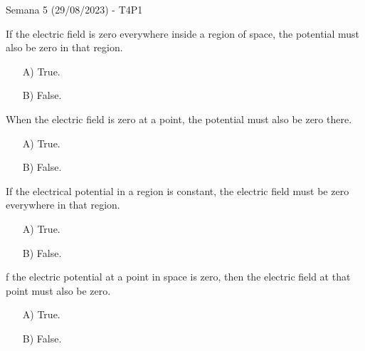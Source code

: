 \begin{frame}{Semana 5 (29/08/2023) - T4P1}
    
    If the electric field is zero everywhere inside a region of space, the potential must also be zero in that region.
    
    \begin{itemize}
        \item[A)] True.
        \item[B)] False.
    \end{itemize}
    
    
    When the electric field is zero at a point, the potential must also be zero there.
    
    \begin{itemize}
        \item[A)] True.
        \item[B)] False.
    \end{itemize}
    
    If the electrical potential in a region is constant, the electric field must be zero everywhere in that region.
    
    \begin{itemize}
        \item[A)] True.
        \item[B)] False.
    \end{itemize}
    
    f the electric potential at a point in space is zero, then the electric field at that point must also be zero.
    
    \begin{itemize}
        \item[A)] True.
        \item[B)] False.
    \end{itemize}
    
\end{frame}

